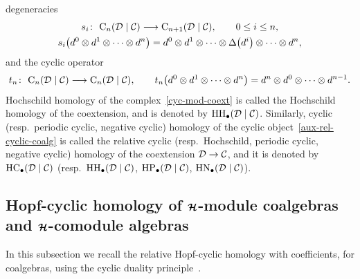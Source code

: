 degeneracies
\begin{gather*}%
s_i\colon \ {\rm C}_n({\cal D}\mid{\cal C}) \longrightarrow {\rm C}_{n+1}({\cal D}\mid{\cal C}),
\qquad
0 \leq i \leq n,
\\
s_i\big(d^0\otimes d^1\otimes \cdots\otimes d^n\big) =d^0\otimes d^1\otimes \cdots \otimes\Delta\big(d^i\big)\otimes \cdots \otimes
d^n,
\end{gather*}
and the cyclic operator
\begin{gather*}%
t_n\colon \ {\rm C}_n({\cal D}\mid{\cal C}) \longrightarrow {\rm C}_n({\cal D}\mid{\cal C}),
\qquad
t_n\big(d^0\otimes d^1\otimes \cdots\otimes d^n\big) =d^n\otimes d^0\otimes \cdots\otimes d^{n-1}.
\end{gather*}
Hochschild homology of the complex~\eqref{cyc-mod-coext} is called the Hochschild homology of the coextension, and is
denoted by ${\rm HH}_\bullet({\cal D}\mid{\cal C})$.
Similarly, cyclic (resp.\
periodic cyclic, negative cyclic) homology of the cyclic object~\eqref{aux-rel-cyclic-coalg} is called the relative
cyclic (resp.\
Hochschild, periodic cyclic, negative cyclic) homology of the coextension ${\cal D} \rightarrow{\cal C}$, and it is
denoted by ${\rm HC}_\bullet({\cal D}\mid{\cal C})$ (resp.\
${\rm HH}_\bullet({\cal D}\mid{\cal C})$, ${\rm HP}_\bullet({\cal D}\mid{\cal C})$, ${\rm HN}_\bullet({\cal D}\mid{\cal C})$).

\subsection[Hopf-cyclic homology of ${\cal H}$-module coalgebras and ${\cal H}$-comodule algebras]{Hopf-cyclic homology
of $\boldsymbol{\cal H}$-module coalgebras and $\boldsymbol{\cal H}$-comodule algebras}

In this subsection we recall the relative Hopf-cyclic homology with coef\/f\/icients, for coalgebras, using the cyclic
duality principle~\cite{Conn83,KhalRang05}.

